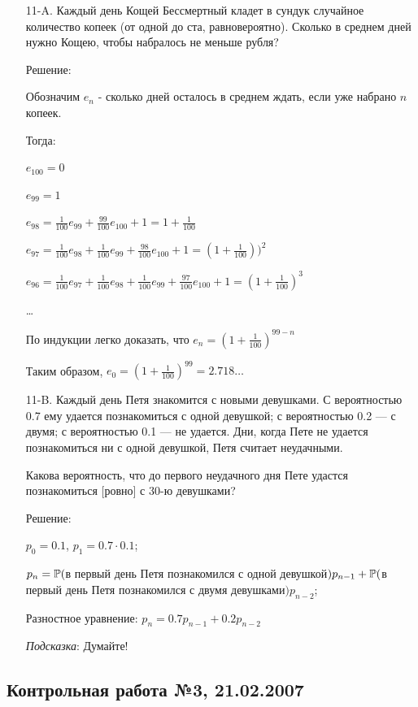 \documentclass[12pt, a4paper]{article}\usepackage[]{graphicx}\usepackage[]{color}
\begin{document}
\begin{enumerate}
\item[11-A.] Каждый день Кощей Бессмертный кладет в сундук случайное количество
копеек (от одной до ста, равновероятно). Сколько в среднем дней нужно Кощею, чтобы набралось не меньше рубля?

Решение:

Обозначим $e_{n}$ - сколько дней осталось в среднем ждать, если
уже набрано $n$ копеек.

Тогда:

$e_{100}=0$

$e_{99}=1$

$e_{98}=\frac{1}{100}e_{99}+\frac{99}{100}e_{100}+1=1+\frac{1}{100}$

$e_{97}=\frac{1}{100}e_{98}+\frac{1}{100}e_{99}+\frac{98}{100}e_{100}+1=(1+\frac{1}{100}))^{2}$

$e_{96}=\frac{1}{100}e_{97}+\frac{1}{100}e_{98}+\frac{1}{100}e_{99}+\frac{97}{100}e_{100}+1=(1+\frac{1}{100})^{3}$

\ldots

По индукции легко доказать, что $e_{n}=(1+\frac{1}{100})^{99-n}$

Таким образом, $e_{0}=(1+\frac{1}{100})^{99}=2.718 \ldots$

\item[11-B.] Каждый день Петя знакомится с новыми девушками. С вероятностью 0.7
ему удается познакомиться с одной девушкой; с вероятностью 0.2 — с
двумя; с вероятностью 0.1 — не удается. Дни, когда Пете не удается
познакомиться ни с одной девушкой, Петя считает неудачными.

Какова вероятность, что до первого неудачного дня Пете удастся
познакомиться $[$ровно$]$ с 30-ю девушками?

Решение:

$p_{0}=0.1$, $p_{1}=0.7\cdot 0.1$;

$p_{n}=\P($в первый день Петя познакомился с одной
девушкой$)p_{n-1}+\P($в первый день Петя познакомился с двумя
девушками$)p_{n-2}$;

Разностное уравнение: $p_{n}=0.7p_{n-1}+0.2p_{n-2}$

\emph{Подсказка}: Думайте!
\end{enumerate}


\subsection{Контрольная работа №3, 21.02.2007}
\end{document}
